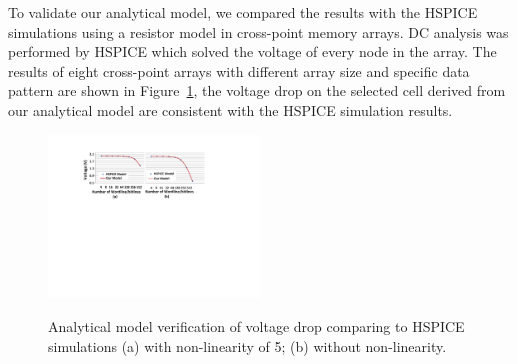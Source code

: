 To validate our analytical model, we compared the results with the HSPICE
simulations using a resistor model in cross-point memory arrays. DC
analysis was performed by HSPICE which solved the voltage of every node in
the array. The results of eight cross-point arrays with different array
size and specific data pattern are shown in Figure~\ref{fig:reliable_region}, the voltage drop on
the selected cell derived from our analytical model are consistent with the
HSPICE simulation results.
\begin{figure}%
\centering\label{fig:SPICE}
  \includegraphics[width=0.5\textwidth]{./figures/SPICE.pdf}\\
  \caption{Analytical model verification of voltage drop comparing to HSPICE simulations (a) with non-linearity of 5; (b) without non-linearity.}\label{fig:reliable_region}
    \vspace{-10pt}
\end{figure}
%
